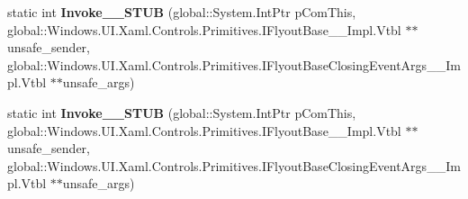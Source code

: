 \begin{DoxyCompactItemize}
\item 
\mbox{\label{struct_windows_1_1_foundation_1_1_typed_event_handler___a___windows___u_i___xaml___controls___pr37c6ff56f5f57bf809643c4cf92c5f10_a036733a34e5c5532f59a15dadc6c6440}} 
static int {\bfseries Invoke\+\_\+\+\_\+\+S\+T\+UB} (global\+::\+System.\+Int\+Ptr p\+Com\+This, global\+::\+Windows.\+U\+I.\+Xaml.\+Controls.\+Primitives.\+I\+Flyout\+Base\+\_\+\+\_\+\+Impl.\+Vtbl $\ast$$\ast$unsafe\+\_\+sender, global\+::\+Windows.\+U\+I.\+Xaml.\+Controls.\+Primitives.\+I\+Flyout\+Base\+Closing\+Event\+Args\+\_\+\+\_\+\+Impl.\+Vtbl $\ast$$\ast$unsafe\+\_\+args)
\item 
\mbox{\label{struct_windows_1_1_foundation_1_1_typed_event_handler___a___windows___u_i___xaml___controls___pr37c6ff56f5f57bf809643c4cf92c5f10_a036733a34e5c5532f59a15dadc6c6440}} 
static int {\bfseries Invoke\+\_\+\+\_\+\+S\+T\+UB} (global\+::\+System.\+Int\+Ptr p\+Com\+This, global\+::\+Windows.\+U\+I.\+Xaml.\+Controls.\+Primitives.\+I\+Flyout\+Base\+\_\+\+\_\+\+Impl.\+Vtbl $\ast$$\ast$unsafe\+\_\+sender, global\+::\+Windows.\+U\+I.\+Xaml.\+Controls.\+Primitives.\+I\+Flyout\+Base\+Closing\+Event\+Args\+\_\+\+\_\+\+Impl.\+Vtbl $\ast$$\ast$unsafe\+\_\+args)
\end{DoxyCompactItemize}

